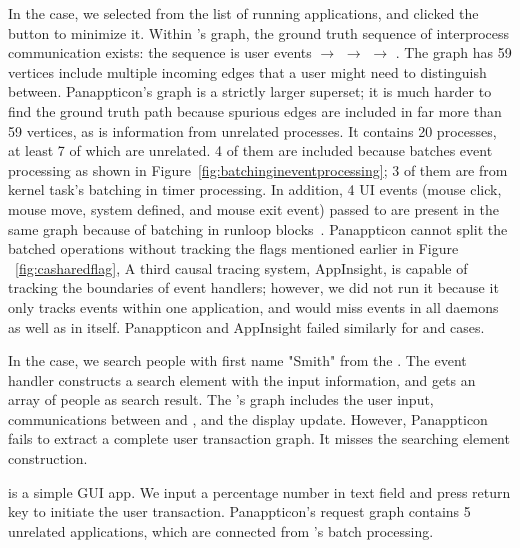 In the  case, we selected  from the list of running
applications, and clicked the  button to minimize it. Within \xxx's
graph, the ground truth sequence of interprocess communication exists: the
sequence is  user events $\rightarrow$ 
$\rightarrow$  $\rightarrow$ . The graph
has 59 vertices include multiple incoming edges that a user might need to
distinguish between. Panappticon's graph is a strictly larger superset; it is
much harder to find the ground truth path because spurious edges are included
in far more than 59 vertices, as is information from unrelated processes.
It contains 20 processes, at least 7 of which are unrelated. 4 of them are
included because  batches event processing as shown in
Figure~\ref{fig:batchingineventprocessing}; 3 of them are from kernel task's
batching in timer processing. In addition, 4 UI events (mouse click, mouse move,
system defined, and mouse exit event) passed to  are present in the
same graph because of batching in runloop blocks~\cite{runloop}. Panappticon
cannot split the batched operations without tracking the flags mentioned earlier
in Figure ~\ref{fig:casharedflag}, A third causal tracing system, AppInsight, is
capable of tracking the boundaries of event handlers; however, we did not run it
because it only tracks events within one application, and would miss events in
all daemons as well as in  itself.  Panappticon and
AppInsight failed similarly for  and  cases.

In the  case, we search people with first name "Smith" from the
. The event handler constructs a search element with the input
information, and gets an array of people as search result. The \xxx's graph
includes the user input, communications between  and ,
and the display update. However, Panappticon fails to extract a complete user
transaction graph. It misses the searching element construction.

 is a simple GUI app. We input a percentage number in text
field and press return key to initiate the user transaction. Panappticon's
request graph contains 5 unrelated applications, which are connected from
's batch processing.



